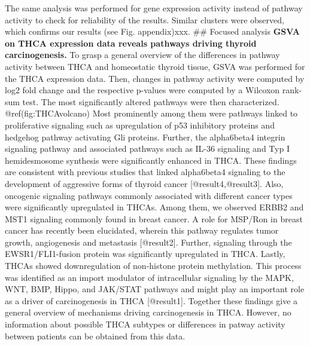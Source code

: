 \documentclass[
]{article}
\begin{document}
The same analysis was performed for gene expression activity instead of
pathway activity to check for reliability of the results. Similar
clusters were observed, which confirms our results (see Fig.
appendix)xxx. \#\# Focused analysis \textbf{GSVA on THCA expression data
reveals pathways driving thyroid carcinogenesis.} To grasp a general
overview of the differences in pathway activity between THCA and
homeostatic thyroid tissue, GSVA was performed for the THCA expression
data. Then, changes in pathway activity were computed by log2 fold
change and the respective p-values were computed by a Wilcoxon rank-sum
test. The most significantly altered pathways were then characterized.
@ref(fig:THCAvolcano) Most prominently among them were pathways linked
to proliferative signaling such as upregulation of p53 inhibitory
proteins and hedgehog pathway activating Gli proteins. Further, the
alpha6beta4 integrin signaling pathway and associated pathways such as
IL-36 signaling and Typ I hemidesmosome synthesis were significantly
enhanced in THCA. These findings are consistent with previous studies
that linked alpha6beta4 signaling to the development of aggressive forms
of thyroid cancer {[}@result4,@result3{]}. Also, oncogenic signaling
pathways commonly associated with different cancer types were
significantly upregulated in THCAs. Among them, we observed ERBB2 and
MST1 signaling commonly found in breast cancer. A role for MSP/Ron in
breast cancer has recently been elucidated, wherein this pathway
regulates tumor growth, angiogenesis and metastasis {[}@result2{]}.
Further, signaling through the EWSR1/FLI1-fusion protein was
significantly upregulated in THCA. Lastly, THCAs showed downregulation
of non-histone protein methylation. This process was identified as an
import modulator of intracellular signaling by the MAPK, WNT, BMP,
Hippo, and JAK/STAT pathways and might play an important role as a
driver of carcinogenesis in THCA {[}@result1{]}. Together these findings
give a general overview of mechanisms driving carcinogenesis in THCA.
However, no information about possible THCA subtypes or differences in
patway activity between patients can be obtained from this data.
\end{document}
